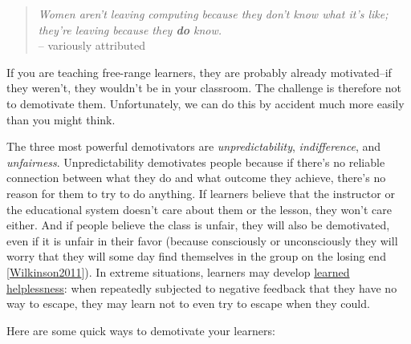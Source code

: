 \documentclass[10pt,statementpaper]{memoir}
\begin{document}
\begin{quote}
\emph{Women aren't leaving computing because they don't know what it's
like; they're leaving because they \textbf{do} know.}\\
-- variously attributed
\end{quote}

If you are teaching free-range learners, they are probably already
motivated--if they weren't, they wouldn't be in your classroom. The
challenge is therefore not to demotivate them. Unfortunately, we can do
this by accident much more easily than you might think.

The three most powerful demotivators are \emph{unpredictability},
\emph{indifference}, and \emph{unfairness}. Unpredictability demotivates
people because if there's no reliable connection between what they do
and what outcome they achieve, there's no reason for them to try to do
anything. If learners believe that the instructor or the educational
system doesn't care about them or the lesson, they won't care either.
And if people believe the class is unfair, they will also be
demotivated, even if it is unfair in their favor (because consciously or
unconsciously they will worry that they will some day find themselves in
the group on the losing end
{[}\href{biblio.html\#wilkinson-pickett-spirit-level}{Wilkinson2011}{]}).
In extreme situations, learners may develop
\href{gloss.html\#learned-helplessness}{learned helplessness}: when
repeatedly subjected to negative feedback that they have no way to
escape, they may learn not to even try to escape when they could.

Here are some quick ways to demotivate your learners:
\end{document}
